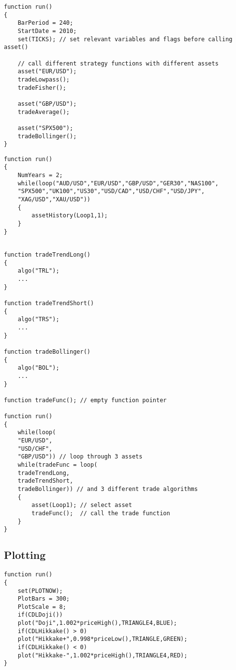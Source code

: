 \begin{lstlisting}[caption=Trade multiple strategies and assets in a single script]
function run()
{
	BarPeriod = 240;
	StartDate = 2010;
	set(TICKS); // set relevant variables and flags before calling asset()
	
	// call different strategy functions with different assets
	asset("EUR/USD");
	tradeLowpass();
	tradeFisher();
	
	asset("GBP/USD");
	tradeAverage();
	
	asset("SPX500");
	tradeBollinger();  
}
\end{lstlisting}

\begin{lstlisting}[caption=Update price history of many assets]
function run()
{
	NumYears = 2;
	while(loop("AUD/USD","EUR/USD","GBP/USD","GER30","NAS100",
	"SPX500","UK100","US30","USD/CAD","USD/CHF","USD/JPY",
	"XAG/USD","XAU/USD"))
	{
		assetHistory(Loop1,1);
	}
}
\end{lstlisting}

\begin{lstlisting}[caption=Portfolio strategy with 3 assets and 3 trade functions]

function tradeTrendLong()
{
	algo("TRL");
	...
}

function tradeTrendShort()
{
	algo("TRS");
	...
}

function tradeBollinger()
{
	algo("BOL");
	...
}

function tradeFunc(); // empty function pointer

function run()
{
	while(loop(
	"EUR/USD",
	"USD/CHF",
	"GBP/USD")) // loop through 3 assets
	while(tradeFunc = loop(
	tradeTrendLong,
	tradeTrendShort,
	tradeBollinger)) // and 3 different trade algorithms
	{
		asset(Loop1); // select asset
		tradeFunc();  // call the trade function
	}
}
\end{lstlisting}

\subsection{Plotting}

\begin{lstlisting}[caption=Plot Triangle above Candle Patterns]
function run()
{
	set(PLOTNOW);
	PlotBars = 300;
	PlotScale = 8;
	if(CDLDoji())
	plot("Doji",1.002*priceHigh(),TRIANGLE4,BLUE);
	if(CDLHikkake() > 0)
	plot("Hikkake+",0.998*priceLow(),TRIANGLE,GREEN);
	if(CDLHikkake() < 0)
	plot("Hikkake-",1.002*priceHigh(),TRIANGLE4,RED);
}
\end{lstlisting}


